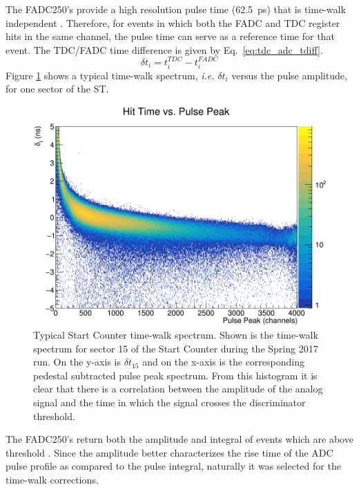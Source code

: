 The FADC250's provide a high resolution pulse time (62.5~ps) that is time-walk independent \cite{pooser16} \cite{dong_fadc}.  Therefore, for events in which both the FADC and TDC register hits in the same channel, the pulse time can serve as a reference time for that event.  The TDC/FADC time difference is given by Eq.~\ref{eq:tdc_adc_tdiff}.
	\begin{equation} \label{eq:tdc_adc_tdiff}
		\delta t_{i} = t^{TDC}_{i} - t^{FADC}_{i}
	\end{equation}
Figure \ref{fig:twdistuncorrch15} shows a typical time-walk spectrum, \textit{i.e.} $\delta t_{i}$ versus the pulse amplitude, for one sector of the ST.
	\begin{figure}[!htb]
		\centering
		\includegraphics[width=1.0\columnwidth]{calibration/figs/tw_dist_uncorr_ch15}
		\caption{Typical Start Counter time-walk spectrum.  Shown is the time-walk spectrum for sector 15 of the Start Counter during the Spring 2017 run. On the y-axis is $\delta t_{15}$ and on the x-axis is the corresponding pedestal subtracted pulse peak spectrum. From this histogram it is clear that there is a correlation between the amplitude of the analog signal and the time in which the signal crosses the discriminator threshold.}
		\label{fig:twdistuncorrch15}
	\end{figure}
The FADC250's return both the amplitude and integral of events which are above threshold \cite{dong_fadc}.  Since the amplitude better characterizes the rise time of the ADC pulse profile as compared to the pulse integral, naturally it was selected for the time-walk corrections.

